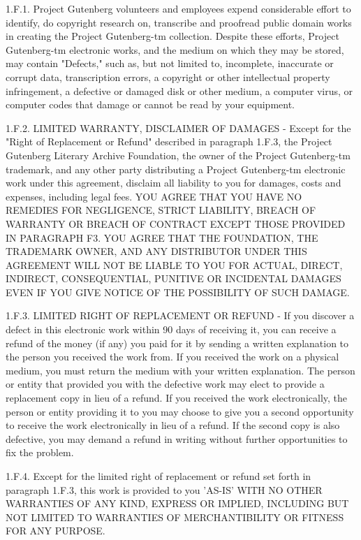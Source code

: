 1.F.1.  Project Gutenberg volunteers and employees expend considerable
effort to identify, do copyright research on, transcribe and proofread
public domain works in creating the Project Gutenberg-tm
collection.  Despite these efforts, Project Gutenberg-tm electronic
works, and the medium on which they may be stored, may contain
"Defects," such as, but not limited to, incomplete, inaccurate or
corrupt data, transcription errors, a copyright or other intellectual
property infringement, a defective or damaged disk or other medium, a
computer virus, or computer codes that damage or cannot be read by
your equipment.

1.F.2.  LIMITED WARRANTY, DISCLAIMER OF DAMAGES - Except for the "Right
of Replacement or Refund" described in paragraph 1.F.3, the Project
Gutenberg Literary Archive Foundation, the owner of the Project
Gutenberg-tm trademark, and any other party distributing a Project
Gutenberg-tm electronic work under this agreement, disclaim all
liability to you for damages, costs and expenses, including legal
fees.  YOU AGREE THAT YOU HAVE NO REMEDIES FOR NEGLIGENCE, STRICT
LIABILITY, BREACH OF WARRANTY OR BREACH OF CONTRACT EXCEPT THOSE
PROVIDED IN PARAGRAPH F3.  YOU AGREE THAT THE FOUNDATION, THE
TRADEMARK OWNER, AND ANY DISTRIBUTOR UNDER THIS AGREEMENT WILL NOT BE
LIABLE TO YOU FOR ACTUAL, DIRECT, INDIRECT, CONSEQUENTIAL, PUNITIVE OR
INCIDENTAL DAMAGES EVEN IF YOU GIVE NOTICE OF THE POSSIBILITY OF SUCH
DAMAGE.

1.F.3.  LIMITED RIGHT OF REPLACEMENT OR REFUND - If you discover a
defect in this electronic work within 90 days of receiving it, you can
receive a refund of the money (if any) you paid for it by sending a
written explanation to the person you received the work from.  If you
received the work on a physical medium, you must return the medium with
your written explanation.  The person or entity that provided you with
the defective work may elect to provide a replacement copy in lieu of a
refund.  If you received the work electronically, the person or entity
providing it to you may choose to give you a second opportunity to
receive the work electronically in lieu of a refund.  If the second copy
is also defective, you may demand a refund in writing without further
opportunities to fix the problem.

1.F.4.  Except for the limited right of replacement or refund set forth
in paragraph 1.F.3, this work is provided to you 'AS-IS' WITH NO OTHER
WARRANTIES OF ANY KIND, EXPRESS OR IMPLIED, INCLUDING BUT NOT LIMITED TO
WARRANTIES OF MERCHANTIBILITY OR FITNESS FOR ANY PURPOSE.

